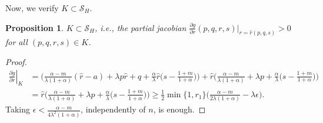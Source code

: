 \documentclass[a4paper,11pt]{article}
\newtheorem{proposition}{Proposition}[section]
\newtheorem{definition}{Definition}[section]
\theoremstyle{remark}
\begin{document}
Now, we verify $K\subset \mathcal{S}_H$. %
\begin{proposition}
$K\subset \mathcal{S}_H$, i.e., the partial jacobian $\frac{\partial g}{\partial r}(p,q,r,s)|_{r=\hat{r}(p,q,s)} >0 $ for all $(p,q,r,s)\in K$. %
\end{proposition}
\begin{proof}
 \begin{align*}
 \left.\frac{\partial g}{\partial r}\right|_{K} &= \Big(\frac{\alpha-m}{\lambda(1+\alpha)}(\hat{r}-a) + \lambda p\hat{r} + q +\frac{\alpha}{\lambda}\hat{r}\big(s- \frac{1+m}{1+\alpha}\big)\Big) + \hat{r}\Big(\frac{\alpha-m}{\lambda(1+\alpha)} + \lambda p + \frac{\alpha}{\lambda}\big(s- \frac{1+m}{1+\alpha}\big)\Big)\\
 &= \hat{r}\Big(\frac{\alpha-m}{\lambda(1+\alpha)} + \lambda p + \frac{\alpha}{\lambda}\big(s- \frac{1+m}{1+\alpha}\big) \Big)\ge \frac{1}{2}\min\{1,r_1\}\Big(\frac{\alpha-m}{2\lambda(1+\alpha)} - \lambda \epsilon\Big).
 \end{align*}
 Taking $\epsilon < \frac{\alpha-m}{4\lambda^2(1+\alpha)}$, independently of $n$, is enough.
\end{proof}
\end{document}
